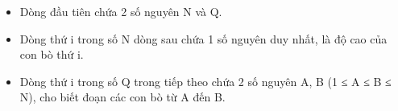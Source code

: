 \begin{itemize}
	\item     Dòng đầu tiên chứa 2 số nguyên N và Q.   
	\item     Dòng thứ i trong số N dòng sau chứa 1 số nguyên duy nhất, là độ cao của con bò thứ i.   
	\item     Dòng thứ i trong số Q trong tiếp theo chứa 2 số nguyên A, B (1 ≤ A ≤ B ≤ N), cho biết đoạn các con bò từ A đến B.   
\end{itemize}

\